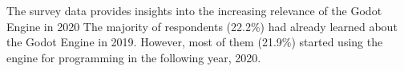 The survey data provides insights into the increasing relevance of the Godot Engine in 2020
The majority of respondents (22.2\%) had already learned about the Godot Engine in 2019.
However, most of them (21.9\%) started using the engine for programming in the following year, 2020.
